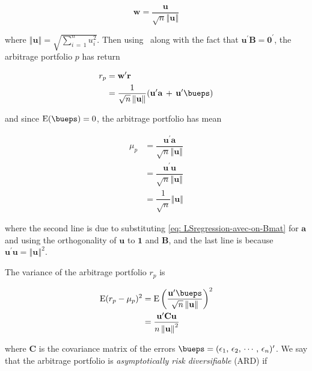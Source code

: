 \documentclass[graybox,envcountchap,sectrefs]{svmono}\usepackage[]{graphicx}\usepackage[]{xcolor}
\begin{document}
\begin{appendices}
\begin{equation}
\mathbf{w=}\frac{\ensuremath{\mathbf{u}}}{\sqrt{n}\mathrm{\left\Vert \ensuremath{\mathbf{u}}\right\Vert }}
\end{equation}

where $\left\Vert \ensuremath{\mathbf{u}}\right\Vert =\sqrt{\sum_{i\,=\,1}^{n}u_{i}^{2}}$.
Then using \APTreturnsModel\  along with the fact that $\mathbf{u}^{\prime}\mathbf{B}=\mathbf{0}^{\prime}$,
the arbitrage portfolio $p$ has return

\begin{align}
r_{p} & =\mathbf{w}^{\prime}\mathbf{r}\nonumber \\
 & =\dfrac{1}{\sqrt{n}\left\Vert \ensuremath{\mathbf{u}}\right\Vert }(\mathbf{u}^{\prime}\mathbf{a}\,+\,\mathbf{u}^{\prime}\bueps)\label{eq: arbPortfolioReturn}
\end{align}

and since $\mathrm{E}(\bueps)=0$, the arbitrage portfolio has mean

\begin{align}
\mu_{p} & =\dfrac{\mathbf{u}^{\prime}\mathbf{a}}{\sqrt{n}\left\Vert \ensuremath{\mathbf{u}}\right\Vert }\nonumber \\
 & =\dfrac{\mathbf{u}^{\prime}\ensuremath{\mathbf{u}}}{\sqrt{n}\left\Vert \ensuremath{\mathbf{u}}\right\Vert }\nonumber \\
 & =\dfrac{1}{\sqrt{n}}\left\Vert \ensuremath{\mathbf{u}}\right\Vert \label{eq: arbPorMean}
\end{align}

where the second line is due to substituting \eqref{eq: LSregression-avec-on-Bmat}
for $\mathbf{a}$ and using the orthogonality of $\mathbf{u}$ to
$\mathbf{1}$ and $\mathbf{B}$, and the last line is because $\mathbf{u}^{\prime}\ensuremath{\mathbf{u}}=\left\Vert \ensuremath{\mathbf{u}}\right\Vert ^{2}$.

The variance of the arbitrage portfolio $r_{p}$ is

\begin{align}
\mathrm{E}(r_{p}-\mu_{p})^{2} & =\mathrm{E}\left(\dfrac{\mathbf{u}^{\prime}\bueps}{\sqrt{n}\left\Vert \ensuremath{\mathbf{u}}\right\Vert }\right)^{2}\nonumber \\
 & =\dfrac{\mathbf{u}^{\prime}\mathbf{C}\mathbf{u}}{n\left\Vert \ensuremath{\mathbf{u}}\right\Vert ^{2}}\label{eq: arbPortRisk}
\end{align}

where $\mathbf{C}$ is the covariance matrix of the errors $\bueps=(\epsilon_{1},\,\epsilon_{2},\,\cdots,\,\epsilon_{n})^{\prime}$.
We say that the arbitrage portfolio is \emph{asymptotically risk diversifiable
}(ARD) if


\end{appendices}
\end{document}
